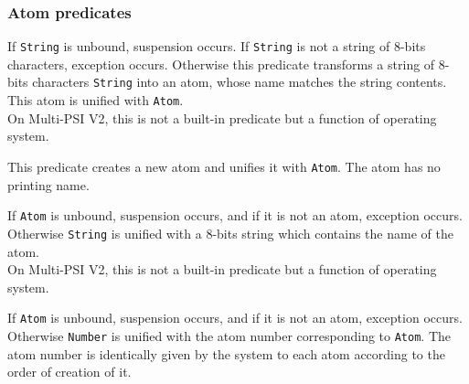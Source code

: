 \subsubsection{Atom predicates}
\begin{itemize}

If \verb|String| is unbound, suspension occurs.
If \verb|String| is not a string of 8-bits characters, exception occurs.
Otherwise this predicate transforms a string of 8-bits characters \verb|String|
into an atom, whose name matches the string contents.
This atom is unified with \verb|Atom|.\\
\Caution On Multi-PSI V2, this is not a built-in predicate but a function
of operating system.

This predicate creates a new atom and unifies it with \verb|Atom|.
The atom has no printing name.

If \verb|Atom| is unbound, suspension occurs, and
if it is not an atom, exception occurs.
Otherwise \verb|String| is unified with a 8-bits string which contains the name
of the atom.\\
\Caution On Multi-PSI V2, this is not a built-in predicate but a function
of operating system.

If \verb|Atom| is unbound, suspension occurs, and
if it is not an atom, exception occurs.
Otherwise \verb|Number| is unified with the atom number
corresponding to \verb|Atom|.
The atom number is identically given by the system to each atom according to
the order of creation of it.

\end{itemize}

